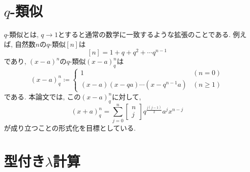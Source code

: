 \documentclass[11pt]{jarticle}
\theoremstyle{mystyle}
\newcommand{\qcoe}[2]{\left[\begin{array}{ccc}#1\\#2\end{array}\right]}
\newcommand{\0}{\textbf{0}}
\newcommand{\1}{\textbf{1}}
\newcommand{\2}{\textbf{2}}
\begin{document}
\tableofcontents
\section{$q$-類似}
$q$-類似とは, $q \to 1$とすると通常の数学に一致するような拡張のことである. 例えば, 自然数$n$の$q$-類似$[n]$は
\[
  [n] = 1 + q + q^2 + \cdots q ^ {n -1} 
\]
であり, $(x-a)^n$の$q$-類似$(x-a)^n_q$は
\[
  (x-a)^n_q \coloneqq \begin{cases}
                                  1 & (n=0)\\
                                  (x-a)(x-qa)\cdots(x-q^{n-1}a) & (n\ge1)
                                \end{cases}
\]
である. 本論文では, この$(x - a)^n_q$に対して, 
\[
  (x+a)^n_q = \sum_{j=0}^n \qcoe{n}{j} q^{\frac{j(j-1)}{2}} a^j x^{n-j}
\]
が成り立つことの形式化を目標としている. 
\section{型付き$\lambda$計算} \label{ssec lambda}
\end{document}
